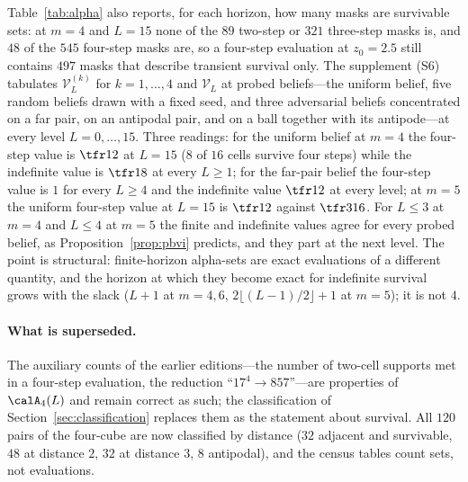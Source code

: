 Table~\ref{tab:alpha} also reports, for each horizon, how many masks are survivable sets: at $m=4$ and $L=15$ none of the $89$ two-step or $321$ three-step masks is, and $48$ of the $545$ four-step masks are, so a four-step evaluation at $z_0=2.5$ still contains $497$ masks that describe transient survival only. The supplement (S6) tabulates $\mathcal V^{(k)}_L$ for $k=1,\dots,4$ and $\mathcal V_L$ at probed beliefs---the uniform belief, five random beliefs drawn with a fixed seed, and three adversarial beliefs concentrated on a far pair, on an antipodal pair, and on a ball together with its antipode---at every level $L=0,\dots,15$. Three readings: for the uniform belief at $m=4$ the four-step value is $\tfr12$ at $L=15$ ($8$ of $16$ cells survive four steps) while the indefinite value is $\tfr18$ at every $L\ge1$; for the far-pair belief the four-step value is $1$ for every $L\ge4$ and the indefinite value $\tfr12$ at every level; at $m=5$ the uniform four-step value at $L=15$ is $\tfr12$ against $\tfr3{16}$. For $L\le3$ at $m=4$ and $L\le4$ at $m=5$ the finite and indefinite values agree for every probed belief, as Proposition~\ref{prop:pbvi} predicts, and they part at the next level. The point is structural: finite-horizon alpha-sets are exact evaluations of a different quantity, and the horizon at which they become exact for indefinite survival grows with the slack ($L+1$ at $m=4,6$, $2\lfloor(L-1)/2\rfloor+1$ at $m=5$); it is not $4$.

\begin{table}[t]
\centering\small
\caption{Size of the alpha-set $\calA_k(L)$ (distinct $k$-step outcome masks over all words), and in parentheses the number of those masks that are blind-survivable sets, for $k=4$ ($m=4,5$) and $k=3$ ($m=6$); the full $k=1,\dots,4$ tables are S6.1--S6.2.}
\label{tab:alpha}

\end{table}

\paragraph{What is superseded.} The auxiliary counts of the earlier editions---the number of two-cell supports met in a four-step evaluation, the reduction ``$17^4\to857$''---are properties of $\calA_4(L)$ and remain correct as such; the classification of Section~\ref{sec:classification} replaces them as the statement about survival. All $120$ pairs of the four-cube are now classified by distance ($32$ adjacent and survivable, $48$ at distance $2$, $32$ at distance $3$, $8$ antipodal), and the census tables count sets, not evaluations.
